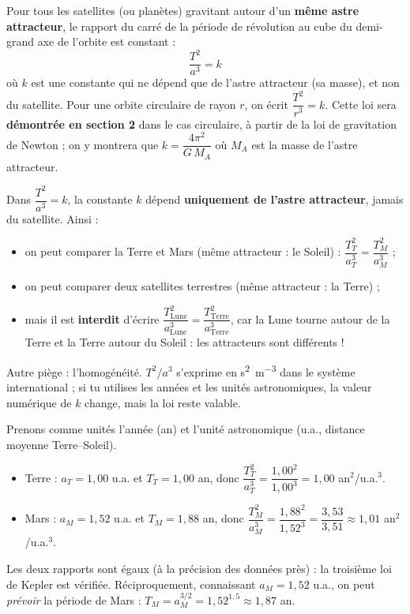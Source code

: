 \documentclass[11pt]{article}
\newcommand{\cle}[1]{{\popxbold\color{popdark}#1}}
\begin{document}
\begin{propriete}
Pour tous les satellites (ou planètes) gravitant autour d'un \textbf{même astre attracteur}, le rapport du carré de la période de révolution au cube du demi-grand axe de l'orbite est constant :
\[ \frac{T^2}{a^3} = k \]
où $k$ est une constante qui ne dépend \cle{que de l'astre attracteur} (sa masse), et non du satellite. Pour une orbite circulaire de rayon $r$, on écrit $\dfrac{T^2}{r^3} = k$. Cette loi sera \textbf{démontrée en section 2} dans le cas circulaire, à partir de la loi de gravitation de Newton ; on y montrera que $k = \dfrac{4\pi^2}{G\,M_A}$ où $M_A$ est la masse de l'astre attracteur.
\end{propriete}

\begin{attention}
Dans $\dfrac{T^2}{a^3} = k$, la constante $k$ dépend \textbf{uniquement de l'astre attracteur}, jamais du satellite. Ainsi :
\begin{itemize}
\item on peut comparer la Terre et Mars (même attracteur : le Soleil) : $\dfrac{T_T^2}{a_T^3} = \dfrac{T_M^2}{a_M^3}$ ;
\item on peut comparer deux satellites terrestres (même attracteur : la Terre) ;
\item mais il est \textbf{interdit} d'écrire $\dfrac{T_{\text{Lune}}^2}{a_{\text{Lune}}^3} = \dfrac{T_{\text{Terre}}^2}{a_{\text{Terre}}^3}$, car la Lune tourne autour de la Terre et la Terre autour du Soleil : les attracteurs sont différents !
\end{itemize}
Autre piège : l'homogénéité. $T^2/a^3$ s'exprime en \si{s^2.m^{-3}} dans le système international ; si tu utilises les années et les unités astronomiques, la valeur numérique de $k$ change, mais la loi reste valable.
\end{attention}

\begin{exemplebox}
Prenons comme unités l'année (an) et l'unité astronomique (u.a., distance moyenne Terre--Soleil).
\begin{itemize}
\item Terre : $a_T = 1{,}00$ u.a. et $T_T = 1{,}00$ an, donc $\dfrac{T_T^2}{a_T^3} = \dfrac{1{,}00^2}{1{,}00^3} = 1{,}00$ an$^2$/u.a.$^3$.
\item Mars : $a_M = 1{,}52$ u.a. et $T_M = 1{,}88$ an, donc $\dfrac{T_M^2}{a_M^3} = \dfrac{1{,}88^2}{1{,}52^3} = \dfrac{3{,}53}{3{,}51} \approx 1{,}01$ an$^2$/u.a.$^3$.
\end{itemize}
Les deux rapports sont égaux (à la précision des données près) : la troisième loi de Kepler est vérifiée. Réciproquement, connaissant $a_M = 1{,}52$ u.a., on peut \emph{prévoir} la période de Mars : $T_M = a_M^{3/2} = 1{,}52^{1{,}5} \approx 1{,}87$ an.
\end{exemplebox}
\end{document}
